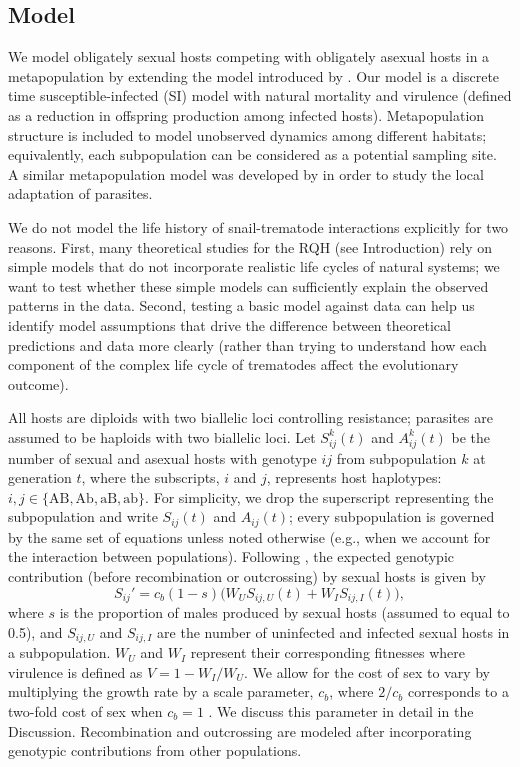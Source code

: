 \documentclass{article}\usepackage[]{graphicx}\usepackage[]{color}
\begin{document}
\subsection{Model}

We model obligately sexual hosts competing with obligately asexual hosts in a metapopulation by extending the model introduced by \cite{lively2010epidemiological}.
Our model is a discrete time susceptible-infected (SI) model with natural mortality and virulence (defined as a reduction in offspring production among infected hosts).
Metapopulation structure is included to model unobserved dynamics among different habitats; equivalently, each subpopulation can be considered as a potential sampling site.
A similar metapopulation model was developed by \cite{lively2018habitat} in order to study the local adaptation of parasites.

We do not model the life history of snail-trematode interactions explicitly for 
two reasons.
First, many theoretical studies for the RQH (see Introduction) rely on simple models 
that do not incorporate realistic life cycles of natural systems; we want to test
whether these simple models can sufficiently explain the observed patterns in the data.
Second, testing a basic model against data can help us identify model assumptions
that drive the difference between theoretical predictions and data more clearly (rather
than trying to understand how each component of the complex life cycle of trematodes 
affect the evolutionary outcome).

All hosts are diploids with two biallelic loci controlling resistance; parasites are assumed to be haploids with two biallelic loci.
Let $S_{ij}^k(t)$ and $A_{ij}^k(t)$ be the number of sexual and asexual hosts with genotype $ij$ from subpopulation $k$ at generation $t$, 
where the subscripts, $i$ and $j$, represents host haplotypes: $i, j \in \{\mathrm{AB}, \mathrm{Ab}, \mathrm{aB}, \mathrm{ab}\}$.
For simplicity, we drop the superscript representing the subpopulation and write $S_{ij}(t)$ and $A_{ij}(t)$;
every subpopulation is governed by the same set of equations unless noted otherwise (e.g., when we account for the interaction between populations).
Following \cite{lively2010epidemiological}, the expected genotypic contribution (before recombination or outcrossing) by sexual hosts is given by
\begin{equation}
S_{ij}' = c_b (1-s) \bigg(W_U S_{ij,U} (t) + W_I S_{ij,I} (t)\bigg),
\end{equation}
where $s$ is the proportion of males produced by sexual hosts (assumed to equal to 0.5), and $S_{ij, U}$ and $S_{ij,I}$ are the number of uninfected and infected sexual hosts in a subpopulation.
$W_U$ and $W_I$ represent their corresponding fitnesses where virulence is defined as $V = 1-W_I/W_U$.
We allow for the cost of sex to vary by multiplying the growth rate by a scale parameter, $c_b$, where $2/c_b$ corresponds to a two-fold cost of sex when $c_b = 1$ \citep{ashby2015diversity}. 
We discuss this parameter in detail in the Discussion.
Recombination and outcrossing are modeled after incorporating genotypic contributions from other populations.
\end{document}
